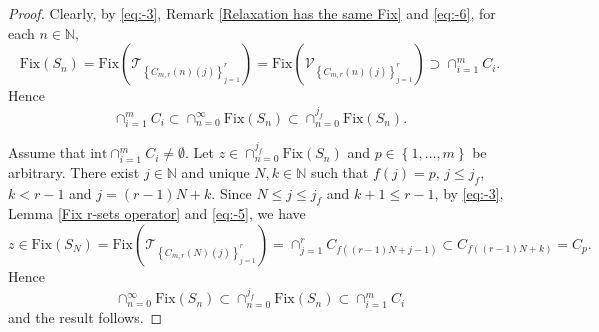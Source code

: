 \documentclass[]{interact}
\theoremstyle{plain}%
\theoremstyle{definition}
\theoremstyle{remark}
\begin{document}
\begin{proof}
Clearly, by \eqref{eq:-3}, Remark \ref{Relaxation has the same Fix}
and \eqref{eq:-6}, for each $n\in\mathbb{N},$
\[
\mathrm{Fix}(S_{n})=\mathrm{Fix}\left(\mathcal{T}_{\left\{ C_{m,r}\left(n\right)\left(j\right)\right\} _{j=1}^{r}}\right)=\mathrm{Fix}\left(\mathcal{V}_{\left\{ C_{m,r}\left(n\right)\left(j\right)\right\} _{j=1}^{r}}\right)\supset\cap_{i=1}^{m}C_{i}.
\]
Hence
\[
\cap_{i=1}^{m}C_{i}\subset\cap_{n=0}^{\infty}\mathrm{Fix}(S_{n})\subset\cap_{n=0}^{j_{f}}\mathrm{Fix}(S_{n}).
\]

Assume that $\mathrm{int}\cap_{i=1}^{m}C_{i}\not=\emptyset$. Let
$z\in\cap_{n=0}^{j_{f}}\mathrm{Fix}(S_{n})$ and $p\in\left\{ 1,\dots,m\right\} $
be arbitrary. There exist $j\in\mathbb{N}$ and unique $N,k\in\mathbb{N}$
such that $f\left(j\right)=p$, $j\le j_{f}$, $k<r-1$ and $j=\left(r-1\right)N+k$.
Since $N\le j\le j_{f}$ and $k+1\le r-1$, by \eqref{eq:-3}, Lemma
\ref{Fix r-sets operator} and \eqref{eq:-5}, we have
\[
z\in\mathrm{Fix}(S_{N})=\mathrm{Fix}\left(\mathcal{T}_{\left\{ C_{m,r}\left(N\right)\left(j\right)\right\} _{j=1}^{r}}\right)=\cap_{j=1}^{r}C_{f\left(\left(r-1\right)N+j-1\right)}\subset C_{f\left(\left(r-1\right)N+k\right)}=C_{p}.
\]
Hence
\[
\cap_{n=0}^{\infty}\mathrm{Fix}(S_{n})\subset\cap_{n=0}^{j_{f}}\mathrm{Fix}(S_{n})\subset\cap_{i=1}^{m}C_{i}
\]
and the result follows.
\end{proof}
\end{document}
